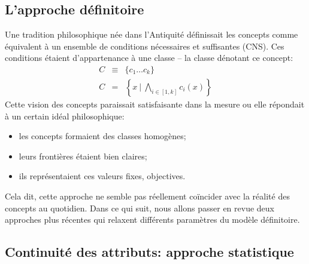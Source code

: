\documentclass[french]{article}
\begin{document}
		\subsection{L'approche définitoire}
			Une tradition philosophique née dans l'Antiquité définissait les concepts comme équivalent à un ensemble de conditions nécessaires et suffisantes (CNS). Ces conditions étaient d'appartenance à une classe -- la classe dénotant ce concept:
			\begin{eqnarray}
			C &\equiv&  \lbrace c_1 \dots c_k \rbrace \\
			C &=& \left\lbrace x \ |\ \bigwedge_{i \in [1, k]}c_i(x)\right\rbrace
			\end{eqnarray}
			Cette vision des concepts paraissait satisfaisante dans la mesure ou elle répondait à un certain idéal philosophique:
			\begin{itemize}
				\item les concepts formaient des classes homogènes;
				\item leurs frontières étaient bien claires;
				\item ils représentaient ces valeurs fixes, objectives.
			\end{itemize}
			Cela dit, cette approche ne semble pas réellement coïncider avec la réalité des concepts au quotidien. Dans ce qui suit, nous allons passer en revue deux approches plus récentes qui relaxent différents paramètres du modèle définitoire.
			\subsection{Continuité des attributs: approche statistique}
\end{document}
